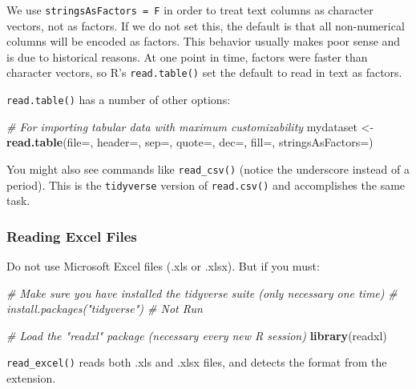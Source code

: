 \documentclass[
]{book}
\newenvironment{Shaded}{\begin{snugshade}}{\end{snugshade}}
\newcommand{\CommentTok}[1]{\textcolor[rgb]{0.56,0.35,0.01}{\textit{#1}}}
\newcommand{\DataTypeTok}[1]{\textcolor[rgb]{0.13,0.29,0.53}{#1}}
\newcommand{\KeywordTok}[1]{\textcolor[rgb]{0.13,0.29,0.53}{\textbf{#1}}}
\newcommand{\NormalTok}[1]{#1}
\newcommand{\StringTok}[1]{\textcolor[rgb]{0.31,0.60,0.02}{#1}}
\begin{document}
We use \texttt{stringsAsFactors\ =\ F} in order to treat text columns as character vectors, not as factors. If we do not set this, the default is that all non-numerical columns will be encoded as factors. This behavior usually makes poor sense and is due to historical reasons. At one point in time, factors were faster than character vectors, so R's \texttt{read.table()} set the default to read in text as factors.

\texttt{read.table()} has a number of other options:

\begin{Shaded}
\begin{Highlighting}[]
\CommentTok{# For importing tabular data with maximum customizability}
\NormalTok{mydataset <-}\StringTok{ }\KeywordTok{read.table}\NormalTok{(}\DataTypeTok{file=}\NormalTok{, }\DataTypeTok{header=}\NormalTok{, }\DataTypeTok{sep=}\NormalTok{, }\DataTypeTok{quote=}\NormalTok{, }\DataTypeTok{dec=}\NormalTok{, }\DataTypeTok{fill=}\NormalTok{, }\DataTypeTok{stringsAsFactors=}\NormalTok{)}
\end{Highlighting}
\end{Shaded}

You might also see commands like \texttt{read\_csv()} (notice the underscore instead of a period). This is the \texttt{tidyverse} version of \texttt{read.csv()} and accomplishes the same task.

\hypertarget{reading-excel-files}{%
\subsubsection*{Reading Excel Files}\label{reading-excel-files}}

Do not use Microsoft Excel files (.xls or .xlsx). But if you must:

\begin{Shaded}
\begin{Highlighting}[]
\CommentTok{# Make sure you have installed the tidyverse suite (only necessary one time)}
\CommentTok{# install.packages("tidyverse") # Not Run}

\CommentTok{# Load the "readxl" package (necessary every new R session)}
\KeywordTok{library}\NormalTok{(readxl)}
\end{Highlighting}
\end{Shaded}

\texttt{read\_excel()} reads both .xls and .xlsx files, and detects the format from the extension.
\end{document}
